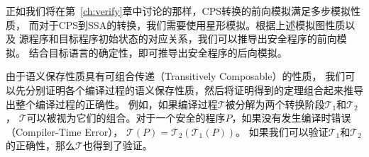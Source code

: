 正如我们将在第~\ref{ch:verify}章中讨论的那样，CPS转换的前向模拟满足多步模拟性质，
而对于CPS到SSA的转换，我们需要使用星形模拟。根据上述模拟图性质以及
源程序和目标程序初始状态的对应关系，我们可以推导出安全程序的前向模拟。
结合目标语言的确定性，即可推导出安全程序的后向模拟。

由于语义保存性质具有可组合传递（Transitively Composable）的性质，
我们可以先分别证明各个编译过程的语义保存性质，然后将证明得到的定理组合起来推导出整个编译过程的正确性。
例如，如果编译过程$\mathcal{T}$被分解为两个转换阶段$\mathcal{T}_1$和$\mathcal{T}_2$，
$\mathcal{T}$可以被视为它们的组合。对于一个安全的程序$P$，如果没有发生编译时错误（Compiler-Time Error），
$\mathcal{T}(P) = \mathcal{T}_2(\mathcal{T}_1(P))$。
如果我们可以验证$\mathcal{T}_1$和$\mathcal{T}_2$的正确性，那么$\mathcal{T}$也得到了验证。


